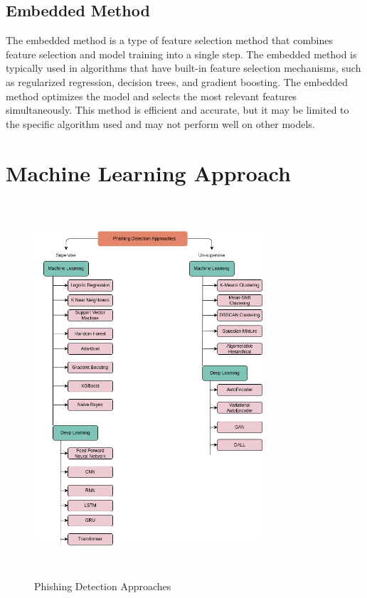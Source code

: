 \documentclass[final]{cvpr}
\begin{document}
\subsection{Embedded Method}
The embedded method is a type of feature selection method that combines feature selection and model training into a single step. The embedded method is typically used in algorithms that have built-in feature selection mechanisms, such as regularized regression, decision trees, and gradient boosting. The embedded method optimizes the model and selects the most relevant features simultaneously. This method is efficient and accurate, but it may be limited to the specific algorithm used and may not perform well on other models.

\section{Machine Learning Approach}
\label{sec:Machine Learning Approach}

\hspace*{-0.9in}
\begin{figure}[h]
   \centering
   \includegraphics[width=8.5cm, height=14cm]{phishing-detection-approaches.png}
   \caption{Phishing Detection Approaches}
   \label{fig:Phishing Detection Approaches}
\end{figure}
\end{document}

